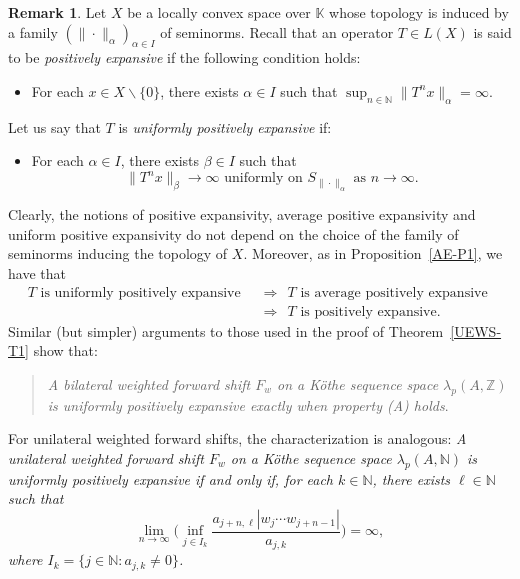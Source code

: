 \documentclass[12pt]{amsart}
\theoremstyle{theorem}
\theoremstyle{definition}
\newtheorem{remark}[theorem]{Remark}
\theoremstyle{remark} \theoremstyle{question} \theoremstyle{example}
\newcommand{\N}{\mathbb{N}}   %
\newcommand{\Z}{\mathbb{Z}}   %
\newcommand{\K}{\mathbb{K}}   %
\begin{document}
\begin{remark}\label{UEWS-R2}
Let $X$ be a locally convex space over $\K$ whose topology is induced by a family $(\|\cdot\|_\alpha)_{\alpha \in I}$ of seminorms.
Recall \cite{BCDFP} that an operator $T \in L(X)$ is said to be {\em positively expansive} if the following condition holds:
\begin{itemize}
\item [(PE)] For each $x \in X \backslash \{0\}$, there exists $\alpha \in I$ such that $\sup_{n \in \N} \|T^n x\|_\alpha = \infty$.
\end{itemize}
Let us say that $T$ is {\em uniformly positively expansive} if:
\begin{itemize}
\item [(UPE)] For each $\alpha \in I$, there exists $\beta \in I$ such that
\[
\|T^n x\|_\beta \to \infty \text{ uniformly on } S_{\|\cdot\|_\alpha} \text{ as } n \to \infty.
\]
\end{itemize}
Clearly, the notions of positive expansivity, average positive expansivity and uniform positive expansivity do not depend on the choice 
of the family of seminorms inducing the topology of $X$. Moreover, as in Proposition~\ref{AE-P1}, we have that
\begin{align*}
T \text{ is uniformly positively expansive } \ &\Longrightarrow \ \ T \text{ is average positively expansive }\\
 &\Longrightarrow \ \ T \text{ is positively expansive}.
\end{align*}
Similar (but simpler) arguments to those used in the proof of Theorem~\ref{UEWS-T1} show that:
\begin{quote}
{\it A bilateral weighted forward shift $F_w$ on a K\"othe sequence space $\lambda_p(A,\Z)$
is uniformly positively expansive exactly when property (A) holds}.
\end{quote}
For unilateral weighted forward shifts, the characterization is analogous:
{\it A unilateral weighted forward shift $F_w$ on a K\"othe sequence space $\lambda_p(A,\N)$
is uniformly positively expansive if and only if, for each $k \in \N$, there exists $\ell \in \N$ such that
\[
\lim_{n \to \infty} \Big(\inf_{j \in I_k} \frac{a_{j+n,\ell} |w_j \cdots w_{j+n-1}|}{a_{j,k}}\Big) = \infty,
\]
where $I_k = \{j \in \N : a_{j,k} \neq 0\}$.}
\end{remark}
\end{document}
